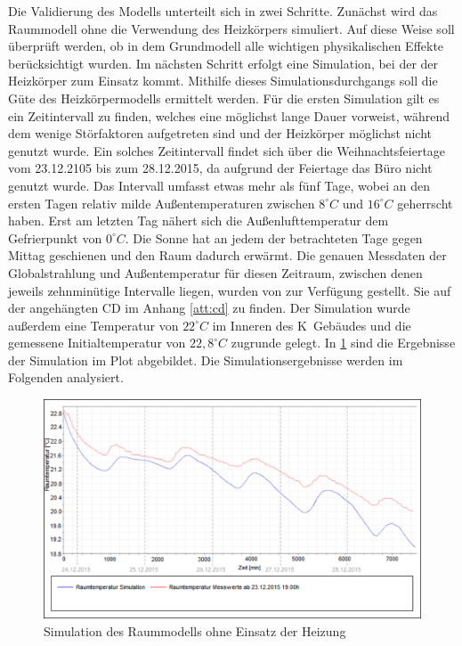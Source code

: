 Die Validierung des Modells unterteilt sich in zwei Schritte. Zunächst wird das Raummodell ohne die Verwendung des Heizkörpers simuliert. Auf diese Weise soll überprüft werden, ob in dem Grundmodell alle wichtigen physikalischen Effekte berücksichtigt wurden. Im nächsten Schritt erfolgt eine Simulation, bei der der Heizkörper zum Einsatz kommt. Mithilfe  dieses Simulationsdurchgangs soll die Güte des Heizkörpermodells ermittelt werden.
Für die ersten Simulation gilt es ein Zeitintervall zu finden, welches eine möglichst lange Dauer vorweist, während dem wenige Störfaktoren aufgetreten sind und der Heizkörper möglichst nicht genutzt wurde. Ein solches Zeitintervall findet sich über die Weihnachtsfeiertage vom 23.12.2105 bis zum 28.12.2015, da aufgrund der Feiertage das Büro nicht genutzt wurde.
Das Intervall umfasst etwas mehr als fünf Tage, wobei an den ersten Tagen relativ milde Außentemperaturen zwischen $8^{\circ}C$ und $16^{\circ}C$ geherrscht haben. Erst am letzten Tag nähert sich die Außenlufttemperatur dem Gefrierpunkt von $0^{\circ}C$. Die Sonne hat an jedem der betrachteten Tage gegen Mittag geschienen und den Raum dadurch erwärmt.
Die genauen Messdaten der Globalstrahlung und Außentemperatur für diesen Zeitraum, zwischen denen jeweils zehnminütige Intervalle liegen, wurden von \cite{wetter} zur Verfügung gestellt. Sie auf der angehängten CD im Anhang \ref{att:cd} zu finden.
Der Simulation wurde außerdem eine Temperatur von $22^{\circ}C$ im Inneren des K~Gebäudes und die gemessene Initialtemperatur von $22,8^{\circ}C$ zugrunde gelegt. In \ref{fig:valid1} sind die Ergebnisse der Simulation im Plot abgebildet. Die Simulationsergebnisse  werden im Folgenden analysiert.


\begin{figure}
\centering
\includegraphics[width=\textwidth]{abbildungen/20160328_validierung1}
\caption{Simulation des Raummodells ohne Einsatz der Heizung}
\label{fig:valid1}
\end{figure}

